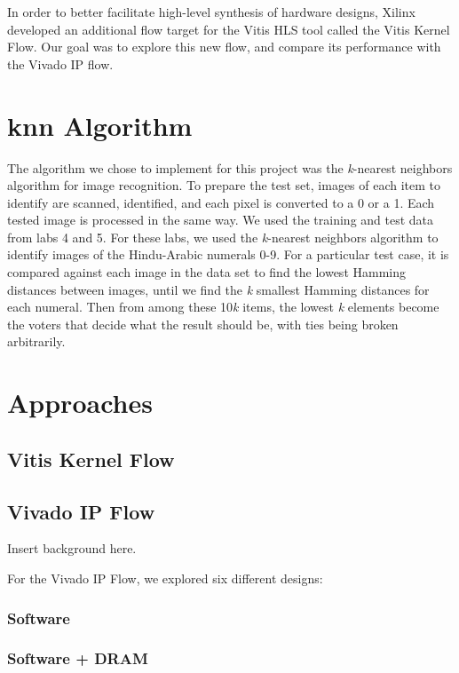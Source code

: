 \documentclass[conference,letter]{IEEEtran}[2015/08/26]
\begin{document}
In order to better facilitate high-level synthesis of hardware designs, Xilinx developed an additional flow target for the Vitis HLS tool called the Vitis Kernel Flow.
Our goal was to explore this new flow, and compare its performance with the Vivado IP flow.

\section{knn Algorithm}
\label{sec:knn-algorithm}

The algorithm we chose to implement for this project was the \textit{k}-nearest neighbors algorithm for image recognition. To prepare the test set, images of each item to identify are scanned, identified, and each pixel is converted to a 0 or a 1. Each tested image is processed in the same way. We used the training and test data from labs 4 and 5. For these labs, we used the \textit{k}-nearest neighbors algorithm to identify images of the Hindu-Arabic numerals 0-9. For a particular test case, it is compared against each image in the data set to find the lowest Hamming distances between images, until we find the \textit{k} smallest Hamming distances for each numeral. Then from among these 10\textit{k} items, the lowest \textit{k} elements become the voters that decide what the result should be, with ties being broken arbitrarily.

\section{Approaches}
\label{sec:approaches}

\subsection{Vitis Kernel Flow}

\subsection{Vivado IP Flow}

Insert background here.

For the Vivado IP Flow, we explored six different designs:

\subsubsection{Software}

\subsubsection{Software + DRAM}
\end{document}
